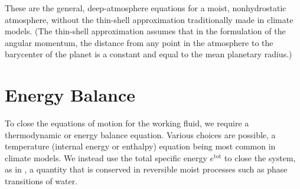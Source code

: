\documentclass{report}
\begin{document}
These are the general, deep-atmosphere equations for a moist, nonhydrostatic atmosphere, without the thin-shell approximation traditionally made in climate models. (The thin-shell approximation assumes that in the formulation of the angular momentum, the distance from any point in the atmosphere to the barycenter of the planet is a constant and equal to the mean planetary radius.)

\section{Energy Balance}\label{s:energy_balance}

To close the equations of motion for the working fluid, we require a thermodynamic or energy balance equation. Various choices are possible, a temperature (internal energy or enthalpy) equation being most common in climate models. We instead use the total specific energy $e^\mathrm{tot}$ to close the system, as in \citet{Romps08a}, a quantity that is conserved in reversible moist processes such as phase transitions of water. 
\end{document}
